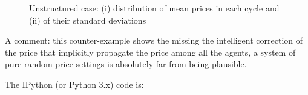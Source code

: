 \documentclass[12pt]{report}
\begin{document}
\begin{figure}[htbp]
\begin{center}
\caption{Unstructured case: (i) distribution of mean prices in each cycle and (ii) of their standard deviations}
\label{output_4_2.png}
\end{center}
\end{figure}

A comment: this counter-example shows the missing the intelligent correction of the price that implicitly propagate the price among all the agents, a system of pure random price settings is absolutely far from being plausible.

The IPython (or Python 3.x) code is:
\end{document}
